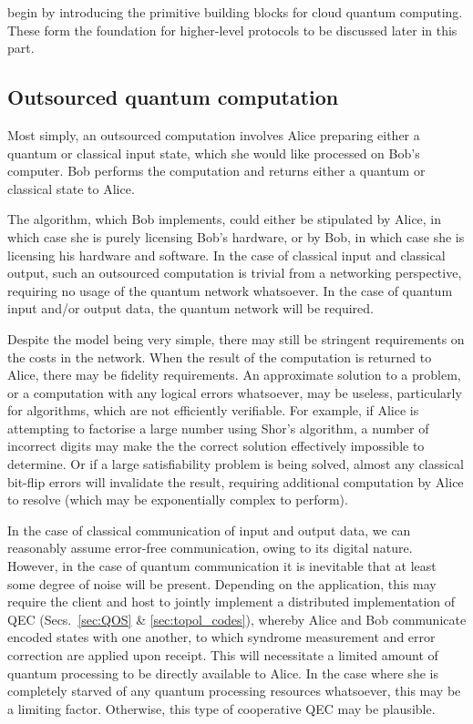  begin by introducing the primitive building blocks for cloud quantum computing. These form the foundation for higher-level protocols to be discussed later in this part. 

%
%

\subsection{Outsourced quantum computation} 

Most simply, an outsourced computation involves Alice preparing either a quantum or classical input state, which she would like processed on Bob's computer. Bob performs the computation and returns either a quantum or classical state to Alice.

The algorithm, which Bob implements, could either be stipulated by Alice, in which case she is purely licensing Bob's hardware, or by Bob, in which case she is licensing his hardware and software. In the case of classical input and classical output, such an outsourced computation is trivial from a networking perspective, requiring no usage of the quantum network whatsoever. In the case of quantum input and/or output data, the quantum network will be required.

Despite the model being very simple, there may still be stringent requirements on the costs in the network. When the result of the computation is returned to Alice, there may be fidelity requirements. An approximate solution to a problem, or a computation with any logical errors whatsoever, may be useless, particularly for algorithms, which are not efficiently verifiable. For example, if Alice is attempting to factorise a large number using Shor's algorithm, a number of incorrect digits may make the the correct solution effectively impossible to determine. Or if a large satisfiability problem is being solved, almost any classical bit-flip errors will invalidate the result, requiring additional computation by Alice to resolve (which may be exponentially complex to perform).

In the case of classical communication of input and output data, we can reasonably assume error-free communication, owing to its digital nature. However, in the case of quantum communication it is inevitable that at least some degree of noise will be present. Depending on the application, this may require the client and host to jointly implement a distributed implementation of QEC (Secs.~\ref{sec:QOS} \& \ref{sec:topol_codes}), whereby Alice and Bob communicate encoded states with one another, to which syndrome measurement and error correction are applied upon receipt. This will necessitate a limited amount of quantum processing to be directly available to Alice. In the case where she is completely starved of any quantum processing resources whatsoever, this may be a limiting factor. Otherwise, this type of cooperative QEC may be plausible.


